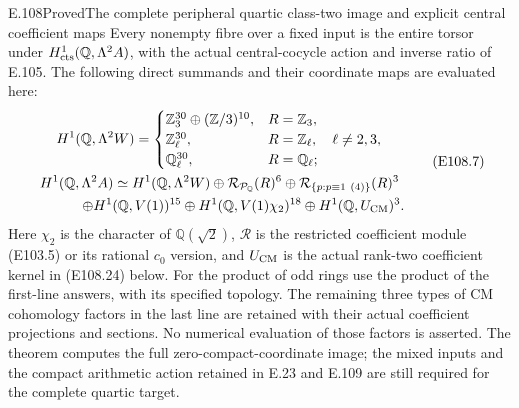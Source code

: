 \begin{statement}{E.108}{Proved}{The complete peripheral quartic class-two image and explicit central coefficient maps}
Every nonempty fibre over a fixed input is the entire torsor
under $H^1_{\rm cts}(\mathbb Q,\Lambda^2 A)$, with the actual
central-cocycle action and inverse ratio of E.105.  The following
direct summands and their coordinate maps are evaluated here:
\[
 \begin{gathered}
 H^1(\mathbb Q,\Lambda^2 W)=
 \begin{cases}
   \mathbb Z_3^{30}\oplus(\mathbb Z/3)^{10},&R=\mathbb Z_3,\\
   \mathbb Z_\ell^{30},&R=\mathbb Z_\ell,\quad\ell\ne2,3,\\
   \mathbb Q_\ell^{30},&R=\mathbb Q_\ell;
 \end{cases}\\
 H^1(\mathbb Q,\Lambda^2 A)\simeq
 H^1(\mathbb Q,\Lambda^2 W)
 \oplus\mathcal R_{\mathcal P_{\mathbb Q}}(R)^6
 \oplus\mathcal R_{\{p:p\equiv1\ (4)\}}(R)^3\\
 \hspace{12mm}\oplus H^1(\mathbb Q,V(1))^{15}
 \oplus H^1(\mathbb Q,V(1)\chi_2)^{18}
 \oplus H^1(\mathbb Q,U_{\rm CM})^3.
 \end{gathered}
 \tag{E108.7}
\]
Here $\chi_2$ is the character of $\mathbb Q(\sqrt2)$,
$\mathcal R$ is the restricted coefficient module (E103.5)
or its rational $c_0$ version, and $U_{\rm CM}$ is the actual
rank-two coefficient kernel in (E108.24) below.
For the product of odd rings use the product of the first-line
answers, with its specified topology.
The remaining three types of CM cohomology factors in the last
line are retained with their actual coefficient projections and
sections.  No numerical evaluation of those factors is asserted.
The theorem computes the full zero-compact-coordinate image;
the mixed inputs and the compact arithmetic action retained in
E.23 and E.109 are still required for the complete quartic target.
\end{statement}

